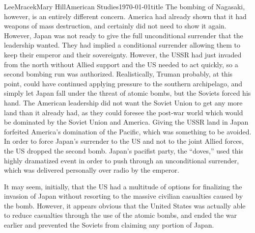\documentclass{article}
\begin{document}
\begin{mla}{Lee}{Mracek}{Mary Hill}{American Studies}{\today}{title}
   The bombing of Nagasaki, however, is an entirely different concern. America had already shown that it had weapons of mass destruction, and certainly did not need to show it again. However, Japan was not ready to give the full unconditional surrender that the leadership wanted. They had implied a conditional surrender allowing them to keep their emperor and their sovereignty. However, the USSR had just invaded from the north without Allied support and the US needed to act quickly, so a second bombing run was authorized. Realistically, Truman probably, at this point, could have continued applying pressure to the southern archipelago, and simply let Japan fall under the threat of atomic bombs, but the Soviets forced his hand. The American leadership did not want the Soviet Union to get any more land than it already had, as they could foresee the post-war world which would be dominated by the Soviet Union and America. Giving the USSR land in Japan forfeited America's domination of the Pacific, which was something to be avoided. In order to force Japan's surrender to the US and not to the joint Allied forces, the US dropped the second bomb. Japan's pacifist party, the ``doves,'' used this highly dramatized event in order to push through an unconditional surrender, which was delivered personally over radio by the emperor.

   It may seem, initially, that the US had a multitude of options for finalizing the invasion of Japan without resorting to the massive civilian casualties caused by the bomb. However, it appears obvious that the United States was actually able to reduce casualties through the use of the atomic bombs, and ended the war earlier and prevented the Soviets from claiming any portion of Japan.
\end{mla}
\end{document}
